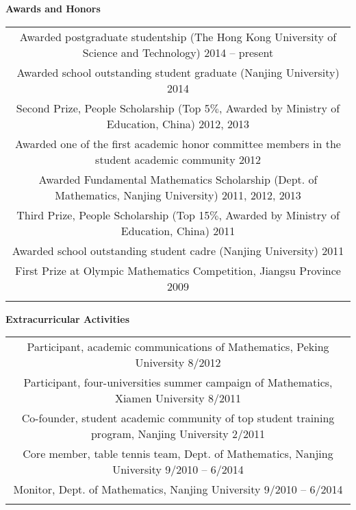 \documentclass[letterpaper,10pt]{article}
\newcommand{\resheading}[1]{{\large \colorbox{mygrey}{\begin{minipage}{\textwidth}{\textbf{#1 \vphantom{p\^{E}}}}\end{minipage}}}}
\begin{document}
\resheading{Awards and Honors}
\begin{center}
\begin{tabular*}{6.5in}{l@{\extracolsep{\fill}}r}
\multicolumn{2}{c}{Awarded postgraduate studentship (The Hong Kong University of Science and Technology) \cftdotfill{\cftdotsep}2014 -- present} \\
\multicolumn{2}{c}{Awarded school outstanding student graduate (Nanjing University) \cftdotfill{\cftdotsep}2014} \\
\multicolumn{2}{c}{Second Prize, People Scholarship (Top 5$\%$, Awarded by Ministry of Education, China) \cftdotfill{\cftdotsep}2012, 2013} \\
\multicolumn{2}{c}{Awarded one of the first academic honor committee members in the student academic community \cftdotfill{\cftdotsep} 2012} \\
\multicolumn{2}{c}{Awarded Fundamental Mathematics  Scholarship (Dept. of Mathematics, Nanjing University) \cftdotfill{\cftdotsep}2011, 2012, 2013} \\
\multicolumn{2}{c}{Third Prize, People Scholarship (Top 15$\%$, Awarded by Ministry of Education, China) \cftdotfill{\cftdotsep}2011} \\
\multicolumn{2}{c}{Awarded school outstanding student cadre (Nanjing University)\cftdotfill{\cftdotsep} 2011} \\
\multicolumn{2}{c}{First Prize at Olympic Mathematics Competition, Jiangsu Province \cftdotfill{\cftdotsep}2009} \\
\vphantom{E}
\end{tabular*}
\end{center}

\vspace{-0.2in}

\resheading{Extracurricular Activities}
\begin{center}
\begin{tabular*}{6.5in}{l@{\extracolsep{\fill}}r}
\multicolumn{2}{c}{Participant, academic communications of Mathematics, Peking University \cftdotfill{\cftdotsep}8/2012} \\
\multicolumn{2}{c}{Participant, four-universities summer campaign of Mathematics, Xiamen University \cftdotfill{\cftdotsep}8/2011} \\
\multicolumn{2}{c}{Co-founder, student academic community of top student training program, Nanjing University \cftdotfill{\cftdotsep}2/2011} \\
\multicolumn{2}{c}{Core member, table tennis team, Dept. of Mathematics, Nanjing University \cftdotfill{\cftdotsep}9/2010 -- 6/2014} \\
\multicolumn{2}{c}{Monitor, Dept. of Mathematics, Nanjing University \cftdotfill{\cftdotsep}9/2010 -- 6/2014} \\
\vphantom{E}
\end{tabular*}
\end{center}


\end{document}
